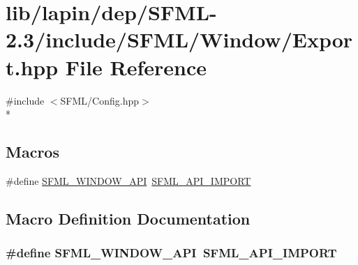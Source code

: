 \hypertarget{lapin_2dep_2_s_f_m_l-2_83_2include_2_s_f_m_l_2_window_2_export_8hpp}{\section{lib/lapin/dep/\-S\-F\-M\-L-\/2.3/include/\-S\-F\-M\-L/\-Window/\-Export.hpp File Reference}
\label{lapin_2dep_2_s_f_m_l-2_83_2include_2_s_f_m_l_2_window_2_export_8hpp}
}
{\ttfamily \#include $<$S\-F\-M\-L/\-Config.\-hpp$>$}\\*
\subsection*{Macros}
\begin{DoxyCompactItemize}
\item 
\#define \hyperlink{lapin_2dep_2_s_f_m_l-2_83_2include_2_s_f_m_l_2_window_2_export_8hpp_a1ab885b7907ee088350359516d68be64}{S\-F\-M\-L\-\_\-\-W\-I\-N\-D\-O\-W\-\_\-\-A\-P\-I}~\hyperlink{sfml_2dep_2_s_f_m_l-2_84_82_2include_2_s_f_m_l_2_config_8hpp_aba0bbe5791bee6633caa835c7f6a12a4}{S\-F\-M\-L\-\_\-\-A\-P\-I\-\_\-\-I\-M\-P\-O\-R\-T}
\end{DoxyCompactItemize}


\subsection{Macro Definition Documentation}
\hypertarget{lapin_2dep_2_s_f_m_l-2_83_2include_2_s_f_m_l_2_window_2_export_8hpp_a1ab885b7907ee088350359516d68be64}{
\subsubsection[{S\-F\-M\-L\-\_\-\-W\-I\-N\-D\-O\-W\-\_\-\-A\-P\-I}]{\setlength{\rightskip}{0pt plus 5cm}\#define S\-F\-M\-L\-\_\-\-W\-I\-N\-D\-O\-W\-\_\-\-A\-P\-I~{\bf S\-F\-M\-L\-\_\-\-A\-P\-I\-\_\-\-I\-M\-P\-O\-R\-T}}}\label{lapin_2dep_2_s_f_m_l-2_83_2include_2_s_f_m_l_2_window_2_export_8hpp_a1ab885b7907ee088350359516d68be64}
